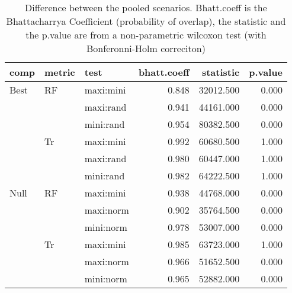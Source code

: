 \begin{table}[ht]
\centering
\begin{tabular}{lllrrr}
  \hline
comp & metric & test & bhatt.coeff & statistic & p.value \\ 
  \hline
Best & RF & maxi:mini & 0.848 & 32012.500 & 0.000 \\ 
   &  & maxi:rand & 0.941 & 44161.000 & 0.000 \\ 
   &  & mini:rand & 0.954 & 80382.500 & 0.000 \\ 
   & Tr & maxi:mini & 0.992 & 60680.500 & 1.000 \\ 
   &  & maxi:rand & 0.980 & 60447.000 & 1.000 \\ 
   &  & mini:rand & 0.982 & 64222.500 & 1.000 \\ 
  Null & RF & maxi:mini & 0.938 & 44768.000 & 0.000 \\ 
   &  & maxi:norm & 0.902 & 35764.500 & 0.000 \\ 
   &  & mini:norm & 0.978 & 53007.000 & 0.000 \\ 
   & Tr & maxi:mini & 0.985 & 63723.000 & 1.000 \\ 
   &  & maxi:norm & 0.966 & 51652.500 & 0.000 \\ 
   &  & mini:norm & 0.965 & 52882.000 & 0.000 \\ 
   \hline
\end{tabular}
\caption{Difference between the pooled scenarios. Bhatt.coeff is the Bhattacharrya Coefficient (probability of overlap), the statistic and the p.value are from a non-parametric wilcoxon test (with Bonferonni-Holm correciton)} 
\label{Full_Tab_pooledscenarios_test}
\end{table}
